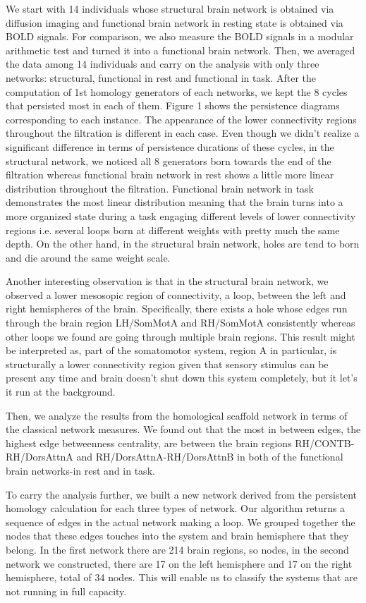 \documentclass[9pt,twocolumn,twoside,lineno]{pnas-new}
\begin{document}
We start with 14 individuals whose structural brain network is obtained via diffusion imaging and functional brain network in resting state is obtained via BOLD signals. For comparison, we also measure the BOLD signals in a modular arithmetic test and turned it into a functional brain network. Then, we averaged the data among 14 individuals and carry on the analysis with only three networks: structural, functional in rest and functional in task. After the computation of 1st homology generators of each networks, we kept the 8 cycles that persisted most in each of them. Figure 1 shows the persistence diagrams corresponding to each instance. The appearance of the lower connectivity regions throughout the filtration is different in each case. Even though we didn't realize a significant difference in terms of persistence durations of these cycles, in the structural network, we noticed all 8 generators born towards the end of the filtration whereas functional brain network in rest shows a little more linear distribution throughout the filtration. Functional brain network in task demonstrates the most linear distribution meaning that the brain turns into a more organized state during a task engaging different levels of lower connectivity regions i.e. several loops born at different weights with pretty much the same depth. On the other hand, in the structural brain network, holes are tend to born and die around the same weight scale. 

Another interesting observation is that in the structural brain network, we observed a lower mesosopic region of connectivity, a loop, between the left and right hemispheres of the brain. Specifically, there exists a hole whose edges run through the brain region LH/SomMotA and RH/SomMotA consistently whereas other loops we found are going through multiple brain regions. This result might be interpreted as, part of the somatomotor system, region A in particular, is structurally a lower connectivity region given that sensory stimulus can be present any time and brain doesn't shut down this system completely, but it let's it run at the background.

Then, we analyze the results from the homological scaffold network in terms of the classical network measures. We found out that the most in between edges, the highest edge betweenness centrality, are between the brain regions RH/CONTB-RH/DorsAttnA and RH/DorsAttnA-RH/DorsAttnB in both of the functional brain networks-in rest and in task.


To carry the analysis further, we built a new network derived from the persistent homology calculation for each three types of network. Our algorithm returns a sequence of edges in the actual network making a loop. We grouped together the nodes that these edges touches into the system and brain hemisphere that they belong. In the first network there are 214 brain regions, so nodes, in the second network we constructed, there are 17 on the left hemisphere and 17 on the right hemisphere, total of 34 nodes. This will enable us to classify the systems that are not running in full capacity.
\end{document}
